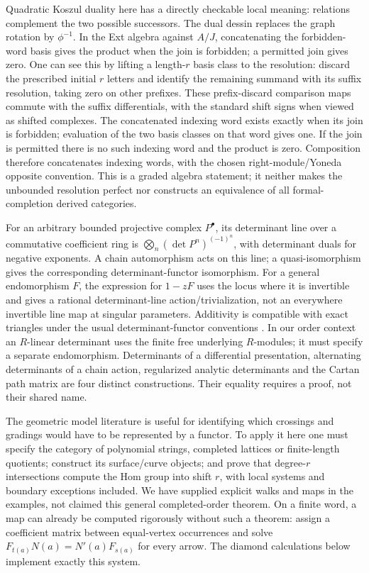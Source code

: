 Quadratic Koszul duality here has a directly checkable local meaning: relations complement the two possible successors. The dual dessin replaces the graph rotation by $\phi^{-1}$. In the Ext algebra against $A/J$, concatenating the forbidden-word basis gives the product when the join is forbidden; a permitted join gives zero. One can see this by lifting a length-$r$ basis class to the resolution: discard the prescribed initial $r$ letters and identify the remaining summand with its suffix resolution, taking zero on other prefixes. These prefix-discard comparison maps commute with the suffix differentials, with the standard shift signs when viewed as shifted complexes. The concatenated indexing word exists exactly when its join is forbidden; evaluation of the two basis classes on that word gives one. If the join is permitted there is no such indexing word and the product is zero. Composition therefore concatenates indexing words, with the chosen right-module/Yoneda opposite convention. This is a graded algebra statement; it neither makes the unbounded resolution perfect nor constructs an equivalence of all formal-completion derived categories.

For an arbitrary bounded projective complex $P^\bullet$, its determinant line over a commutative coefficient ring is $\bigotimes_n(\det P^n)^{(-1)^n}$, with determinant duals for negative exponents. A chain automorphism acts on this line; a quasi-isomorphism gives the corresponding determinant-functor isomorphism. For a general endomorphism $F$, the expression for $1-zF$ uses the locus where it is invertible and gives a rational determinant-line action/trivialization, not an everywhere invertible line map at singular parameters. Additivity is compatible with exact triangles under the usual determinant-functor conventions \cite{KnudsenMumford,Breuning}. In our order context an $R$-linear determinant uses the finite free underlying $R$-modules; it must specify a separate endomorphism. Determinants of a differential presentation, alternating determinants of a chain action, regularized analytic determinants and the Cartan path matrix are four distinct constructions. Their equality requires a proof, not their shared name.

The geometric model literature \cite{GeometricGentle,GeometricResolutions,GeometricKoszul} is useful for identifying which crossings and gradings would have to be represented by a functor. To apply it here one must specify the category of polynomial strings, completed lattices or finite-length quotients; construct its surface/curve objects; and prove that degree-$r$ intersections compute the Hom group into shift $r$, with local systems and boundary exceptions included. We have supplied explicit walks and maps in the examples, not claimed this general completed-order theorem. On a finite word, a map can already be computed rigorously without such a theorem: assign a coefficient matrix between equal-vertex occurrences and solve $F_{t(a)}N(a)=N'(a)F_{s(a)}$ for every arrow. The diamond calculations below implement exactly this system.


